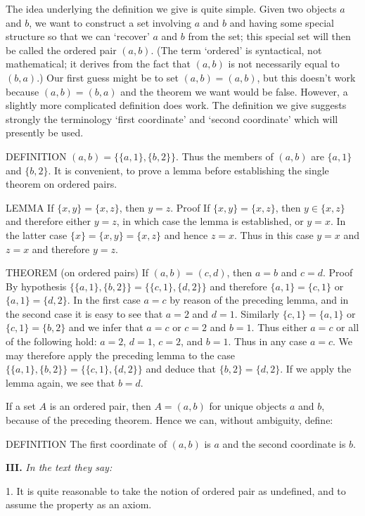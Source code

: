 \documentclass[a4paper]{article}
\newcommand{\ETask}[2]{\medskip\par\textbf{#1.} \textit{#2}\par}
\begin{document}
The idea underlying the definition we give is quite simple. Given two objects $a$ and $b$, we want to construct a set involving
$a$ and $b$ and having some special structure so that we can `recover' $a$ and $b$ from the set; this special set will then be
called the ordered pair $(a, b)$. (The term `ordered' is syntactical, not mathematical; it derives from the fact that $(a, b)$
is not necessarily equal to $(b, a)$.) Our first guess might be to set $(a, b) = (a, b)$, but this doesn't work because
$(a, b) = (b, a)$ and the theorem we want would be false. However, a slightly more complicated definition does work. The
definition we give suggests strongly the terminology `first coordinate' and `second coordinate' which will presently be used.

DEFINITION $(a, b) = \{\{a, 1\}, \{b, 2\}\}$. Thus the members of $(a, b)$ are $\{a, 1\}$ and $\{b,2\}$.
It is convenient, to prove a lemma before establishing the single theorem on ordered pairs.

LEMMA If $\{x, y\} = \{x, z\}$, then $y = z$. Proof If $\{x, y\} = \{x, z\}$, then $y \in \{x, z\}$ and therefore either $y = z$,
in which case the lemma is established, or $y = x$. In the latter case $\{x\} = \{x, y\} = \{x, z\}$ and hence $z = x$. Thus in this
case $y = x$ and $z = x$ and therefore $y = z$.

THEOREM (on ordered pairs) If $(a, b) = (c, d)$, then $a = b$ and $c = d$.
Proof By hypothesis $\{\{a, 1\}, \{b, 2\}\} = \{\{c, 1\}, \{d, 2\}\}$ and therefore $\{a, 1\} = \{c, 1\}$ or $\{a, 1\} = \{d, 2\}$.
In the first case $a = c$ by reason of the preceding lemma, and in the second case it is easy to see that $a = 2$ and $d = 1$.
Similarly $\{c, 1\} = \{a, 1\}$ or $\{c, 1\} = \{b, 2\}$ and we infer that $a = c$ or $c = 2$ and $b = 1$. Thus either $a = c$ or
all of the following hold: $a = 2$, $d = 1$, $c = 2$, and $b = 1$. Thus in any case $a = c$. We may therefore apply the preceding
lemma to the case $\{\{a, 1\}, \{b, 2\}\} = \{\{c, 1\}, \{d, 2\}\}$ and deduce that $\{b, 2\} = \{d, 2\}$. If we apply the lemma
again, we see that $b = d$.

If a set $A$ is an ordered pair, then $A = (a, b)$ for unique objects $a$ and $b$, because of the preceding theorem. Hence we can,
without ambiguity, define:

DEFINITION The first coordinate of $(a, b)$ is $a$ and the second coordinate is $b$.

\ETask{III}{In the text they say:}
1. It is quite reasonable to take the notion of ordered pair as undefined, and to assume the property as an axiom.
\end{document}
